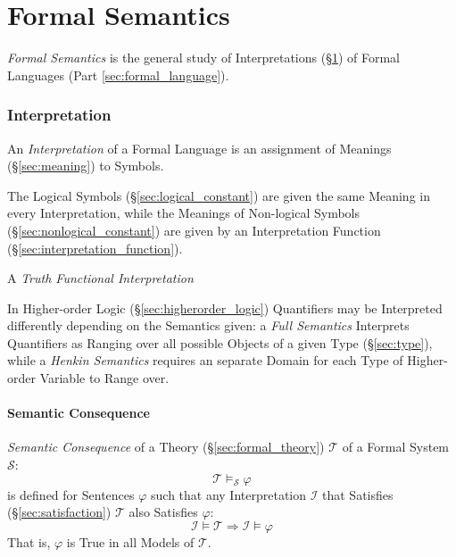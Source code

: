 \part{Formal Semantics}\label{sec:formal_semantics}

\emph{Formal Semantics} is the general study of Interpretations
(\S\ref{sec:interpretation}) of Formal Languages (Part
\ref{sec:formal_language}).



\section{Interpretation}\label{sec:interpretation}

An \emph{Interpretation} of a Formal Language is an assignment of
Meanings (\S\ref{sec:meaning}) to Symbols.

The Logical Symbols (\S\ref{sec:logical_constant}) are given the same
Meaning in every Interpretation, while the Meanings of Non-logical
Symbols (\S\ref{sec:nonlogical_constant}) are given by an Interpretation
Function (\S\ref{sec:interpretation_function}).

A \emph{Truth Functional Interpretation}

In Higher-order Logic (\S\ref{sec:higherorder_logic}) Quantifiers may
be Interpreted differently depending on the Semantics given: a
\emph{Full Semantics} Interprets Quantifiers as Ranging over all
possible Objects of a given Type (\S\ref{sec:type}), while a
\emph{Henkin Semantics} requires an separate Domain for each Type of
Higher-order Variable to Range over.



\subsection{Semantic Consequence}\label{sec:semantic_consequence}

\emph{Semantic Consequence} of a Theory (\S\ref{sec:formal_theory})
$\mathcal{T}$ of a Formal System $\mathcal{S}$:
\[
  \mathcal{T} \vDash_{\mathcal{S}} \varphi
\]
is defined for Sentences $\varphi$ such that any Interpretation
$\mathcal{I}$ that Satisfies (\S\ref{sec:satisfaction}) $\mathcal{T}$
also Satisfies $\varphi$:
\[
  \mathcal{I} \models \mathcal{T}
  \Rightarrow \mathcal{I} \models \varphi
\]
That is, $\varphi$ is True in all Models of $\mathcal{T}$.

